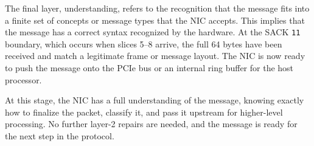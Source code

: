 \documentclass[../HFT-main.tex]{subfiles}
\begin{document}
The final layer, understanding, refers to the recognition that the message fits into a finite set of concepts or message types that the NIC accepts. This implies that the message has a correct syntax recognized by the hardware. At the SACK \texttt{11} boundary, which occurs when slices 5–8 arrive, the full 64 bytes have been received and match a legitimate frame or message layout. The NIC is now ready to push the message onto the PCIe bus or an internal ring buffer for the host processor.

At this stage, the NIC has a full understanding of the message, knowing exactly how to finalize the packet, classify it, and pass it upstream for higher-level processing. No further layer-2 repairs are needed, and the message is ready for the next step in the protocol.



%
%
%
%
\end{document}
